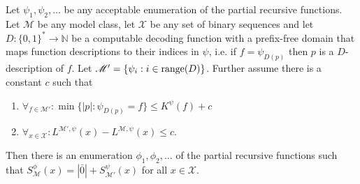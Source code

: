 \documentclass{style/llncs}
\newcommand{\M}{\mathscr M}
\newcommand{\X}{\mathscr X}
\newcommand{\N}{\mathbb N}
\newcommand{\tn}[1]{\textnormal{#1}}
\begin{document}
\begin{lemma}\label{lemma:thecoolone}
  Let $\psi_1,\psi_2,\ldots$ be any acceptable enumeration of the partial recursive functions.
  Let $\M$ be any model class, let $\X$ be any set of binary sequences and let $D:\{0,1\}^*\to\N$ be a computable decoding function with a prefix-free domain that maps function descriptions to their indices in $\psi$, i.e. if $f=\psi_{D(p)}$ then $p$ is a $D$-description of $f$. Let $\M'=\{\psi_i:i\in\tn{range}(D)\}$. Further assume there is a constant $c$ such that
\begin{enumerate}
  \item $\forall_{f\in\M'}:\min\{|p|:\psi_{D(p)}=f\}\le K^\psi(f)+c$
  \item $\forall_{x\in\X}:L^{\M',\psi}(x)-L^{\M,\psi}(x)\le c$.
\end{enumerate}
Then there is an enumeration $\phi_1,\phi_2,\ldots$ of the partial recursive functions such that $S^\phi_{\M}(x) = |\bar 0|+S^\psi_{\M'}(x)$ for all $x\in\X$.
\end{lemma}
\end{document}
